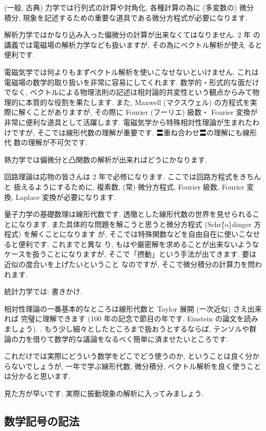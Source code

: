 \documentclass[openany, a4paper, oneside]{book}
\theoremstyle{break}
\theoremstyle{breakdefn}
\begin{document}
(一般, 古典) 力学では行列式の計算や対角化, 各種計算の為に (多変数の) 微分
積分, 現象を記述するための重要な道具である微分方程式が必要になります.

解析力学ではかなり込み入った偏微分の計算が出来なくてはなりません. 2 年
の講義では電磁場の解析力学なども扱いますが, その為にベクトル解析が使え
ると便利です.

電磁気学では何よりもまずベクトル解析を使いこなせないといけません. これは
電磁場の数学的取り扱いを非常に容易にしてくれます. 数学的・形式的な面だけ
でなく, ベクトルによる物理法則の記述は相対論的共変性という観点からみて物
理的に本質的な役割を果たします. また, Maxwell (マクスウェル) の方程式を実
際に解くことがありますが, その際に Fourier (フーリエ) 級数・ Fourier 変換が
非常に便利な道具として活躍します. 電磁気学から特殊相対性理論が生まれたわ
けですが, そこでは線形代数の理解が重要です. 〓重ね合わせ〓の理解にも線形代
数の理解が不可欠です.

熱力学では偏微分と凸関数の解析が出来ればどうにかなります.

回路理論は応物の皆さんは 2 年で必修になります. ここでは回路方程式をきちんと
扱えるようにするために, 複素数, (常) 微分方程式, Fourier 級数, Fourier 変
換, Laplace 変換が必要になります.

量子力学の基礎数理は線形代数です. 透徹とした線形代数の世界を見せられることになります.
また具体的な問題を解こうと思うと微分方程式 (Schr\"\{o\}dinger 方程式) を解くことになります
が, そこでは特殊関数などを自由自在に使いこなせると便利です. これまでと異な
り, もはや厳密解を求めることが出来ないようなケースを扱うことになりますが,
そこで「摂動」という手法が出てきます. 要は近似の度合いを上げたいということ
なのですが, そこで微分積分の計算力を問われます.

統計力学では: 書きかけ.

相対性理論の一番基本的なところは線形代数と Taylor 展開 (一次近似) さえ出来れば
完璧に理解できます (100 年の記念で節目の年です. Einstein の論文を読みましょう). .
もう少し細々としたところまで扱おうとするならば,
テンソルや群論の力を借りて数学的な議論をなるべく簡単に済ませたいところです.

これだけでは実際にどういう数学をどこでどう使うのか,
ということは良く分からないでしょうが, 一年で学ぶ線形代数, 微分積分, ベクトル解析を良く使うことは分かると思います.

見た方が早いです.
実際に振動現象の解析に入ってみましょう.
\subsection{数学記号の記法}
\label{sec-4-3-1-5}
\end{document}
